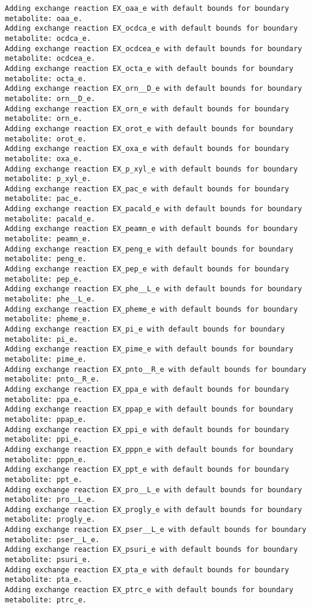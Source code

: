 \documentclass[
  letterpaper,
  DIV=11,
  numbers=noendperiod]{scrartcl}
\begin{document}
\begin{verbatim}
Adding exchange reaction EX_oaa_e with default bounds for boundary metabolite: oaa_e.
Adding exchange reaction EX_ocdca_e with default bounds for boundary metabolite: ocdca_e.
Adding exchange reaction EX_ocdcea_e with default bounds for boundary metabolite: ocdcea_e.
Adding exchange reaction EX_octa_e with default bounds for boundary metabolite: octa_e.
Adding exchange reaction EX_orn__D_e with default bounds for boundary metabolite: orn__D_e.
Adding exchange reaction EX_orn_e with default bounds for boundary metabolite: orn_e.
Adding exchange reaction EX_orot_e with default bounds for boundary metabolite: orot_e.
Adding exchange reaction EX_oxa_e with default bounds for boundary metabolite: oxa_e.
Adding exchange reaction EX_p_xyl_e with default bounds for boundary metabolite: p_xyl_e.
Adding exchange reaction EX_pac_e with default bounds for boundary metabolite: pac_e.
Adding exchange reaction EX_pacald_e with default bounds for boundary metabolite: pacald_e.
Adding exchange reaction EX_peamn_e with default bounds for boundary metabolite: peamn_e.
Adding exchange reaction EX_peng_e with default bounds for boundary metabolite: peng_e.
Adding exchange reaction EX_pep_e with default bounds for boundary metabolite: pep_e.
Adding exchange reaction EX_phe__L_e with default bounds for boundary metabolite: phe__L_e.
Adding exchange reaction EX_pheme_e with default bounds for boundary metabolite: pheme_e.
Adding exchange reaction EX_pi_e with default bounds for boundary metabolite: pi_e.
Adding exchange reaction EX_pime_e with default bounds for boundary metabolite: pime_e.
Adding exchange reaction EX_pnto__R_e with default bounds for boundary metabolite: pnto__R_e.
Adding exchange reaction EX_ppa_e with default bounds for boundary metabolite: ppa_e.
Adding exchange reaction EX_ppap_e with default bounds for boundary metabolite: ppap_e.
Adding exchange reaction EX_ppi_e with default bounds for boundary metabolite: ppi_e.
Adding exchange reaction EX_pppn_e with default bounds for boundary metabolite: pppn_e.
Adding exchange reaction EX_ppt_e with default bounds for boundary metabolite: ppt_e.
Adding exchange reaction EX_pro__L_e with default bounds for boundary metabolite: pro__L_e.
Adding exchange reaction EX_progly_e with default bounds for boundary metabolite: progly_e.
Adding exchange reaction EX_pser__L_e with default bounds for boundary metabolite: pser__L_e.
Adding exchange reaction EX_psuri_e with default bounds for boundary metabolite: psuri_e.
Adding exchange reaction EX_pta_e with default bounds for boundary metabolite: pta_e.
Adding exchange reaction EX_ptrc_e with default bounds for boundary metabolite: ptrc_e.

\end{verbatim}
\end{document}
